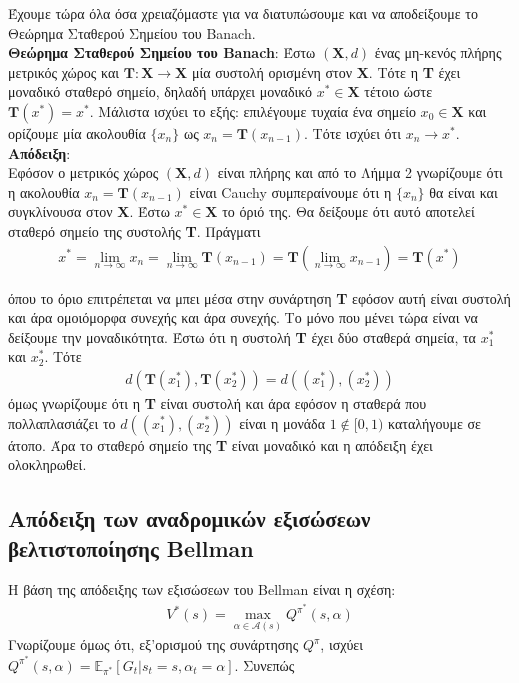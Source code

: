 \documentclass[11pt]{article} %
\numberwithin{equation}{subsection}
\begin{document}
Έχουμε τώρα όλα όσα χρειαζόμαστε για να διατυπώσουμε και να αποδείξουμε το Θεώρημα Σταθερού Σημείου του Banach.\\

\textbf{Θεώρημα Σταθερού Σημείου του Banach}: Έστω $(\textbf{X}, d)$ ένας μη-κενός πλήρης μετρικός χώρος και $\textbf{T}: \textbf{X} \rightarrow \textbf{X}$ μία συστολή ορισμένη στον \textbf{X}. Τότε η \textbf{T} έχει μοναδικό σταθερό σημείο, δηλαδή υπάρχει μοναδικό $x^* \in \textbf{X}$ τέτοιο ώστε $\textbf{T}(x^{*}) = x^{*}$. Μάλιστα ισχύει το εξής: επιλέγουμε τυχαία ένα σημείο $x_0 \in \textbf{X}$ και ορίζουμε μία ακολουθία $\{x_n\}$ ως $x_{n} = \textbf{T}(x_{n - 1})$. Τότε ισχύει ότι $x_n \rightarrow x^{*}$.\\

\textbf{Απόδειξη}: \\
Εφόσον ο μετρικός χώρος $(\textbf{X}, d)$ είναι πλήρης και από το Λήμμα 2 γνωρίζουμε ότι η ακολουθία $x_n = \textbf{T}(x_{n - 1})$ είναι Cauchy συμπεραίνουμε ότι η $\{x_n\}$ θα είναι και συγκλίνουσα στον \textbf{X}. Έστω $x^{*} \in \textbf{X}$ το όριό της. Θα δείξουμε ότι αυτό αποτελεί σταθερό σημείο της συστολής \textbf{T}. Πράγματι
\begin{align*}
x^{*} = \lim_{n\rightarrow \infty} x_{n} = \lim_{n\rightarrow \infty} \textbf{T}(x_{n-1}) = \textbf{T} (\lim_{n\rightarrow \infty} x_{n-1}) = \textbf{T}(x^{*})
\end{align*}

όπου το όριο επιτρέπεται να μπει μέσα στην συνάρτηση \textbf{T} εφόσον αυτή είναι συστολή και άρα ομοιόμορφα συνεχής και άρα συνεχής. Το μόνο που μένει τώρα είναι να δείξουμε την μοναδικότητα. Έστω ότι η συστολή \textbf{T} έχει δύο σταθερά σημεία, τα $x_{1}^{*}$ και $x_{2}^{*}$. Τότε
\begin{align*}
d(\textbf{T}(x_{1}^{*}), \textbf{T}(x_{2}^{*})) = d((x_{1}^{*}), (x_{2}^{*}))
\end{align*}
όμως γνωρίζουμε ότι η \textbf{T} είναι συστολή και άρα εφόσον η σταθερά που πολλαπλασιάζει το $d((x_{1}^{*}), (x_{2}^{*}))$ είναι η μονάδα $1 \notin [0,1)$ καταλήγουμε σε άτοπο. Άρα το σταθερό σημείο της \textbf{T} είναι μοναδικό και η απόδειξη έχει ολοκληρωθεί.




\subsection{Απόδειξη των αναδρομικών εξισώσεων βελτιστοποίησης Bellman}
Η βάση της απόδειξης των εξισώσεων του Bellman είναι η σχέση:
\begin{align*}
V^{*}(s) = \max_{\alpha \in \mathcal{A}(s)} Q^{\pi^{*}}(s,\alpha)
\end{align*}
Γνωρίζουμε όμως ότι, εξ'ορισμού της συνάρτησης $Q^{\pi}$, ισχύει $Q^{\pi^{*}}(s, \alpha) = \mathbb{E}_{\pi^{*}}\left[G_{t} | s_{t} =s, \alpha_{t} = \alpha \right]$. Συνεπώς\\
\end{document}
